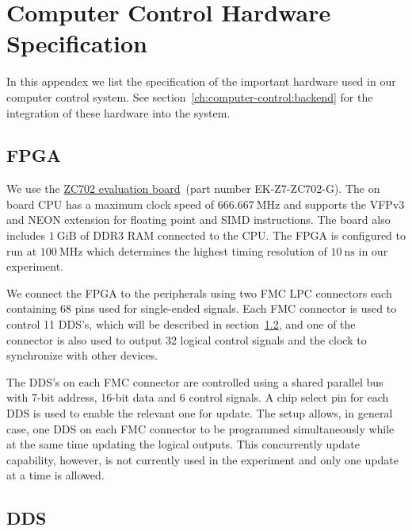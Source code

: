 
\chapter{Computer Control Hardware Specification}
\label{appendex:computer-control}

In this appendex we list the specification of the important hardware
used in our computer control system.
See section~\ref{ch:computer-control:backend} for the integration
of these hardware into the system.

\section{FPGA}
\label{appendex:computer-control:fpga}

We use the \href{https://www.xilinx.com/products/boards-and-kits/ek-z7-zc702-g.html}{ZC702 evaluation board}~(part number EK-Z7-ZC702-G).
The on board CPU has a maximum clock speed of $666.667~\mathrm{MHz}$
and supports the VFPv3 and NEON extension for floating point and SIMD instructions.
The board also includes $1~\mathrm{GiB}$ of DDR3 RAM connected to the CPU.
The FPGA is configured to run at $100~\mathrm{MHz}$ which determines
the highest timing resolution of $10~\mathrm{ns}$ in our experiment.

We connect the FPGA to the peripherals using two FMC LPC connectors
each containing 68 pins used for single-ended signals.
Each FMC connector is used to control 11 DDS's,
which will be described in section~\ref{appendex:computer-control:dds},
and one of the connector is also used to output 32 logical control signals
and the clock to synchronize with other devices.

The DDS's on each FMC connector are controlled using a shared parallel bus
with 7-bit address, 16-bit data and 6 control signals.
A chip select pin for each DDS is used to enable the relevant one for update.
The setup allows, in general case, one DDS on each FMC connector to be programmed
simultaneously while at the same time updating the logical outputs.
This concurrently update capability, however, is not currently used in the experiment
and only one update at a time is allowed.

\section{DDS}
\label{appendex:computer-control:dds}


